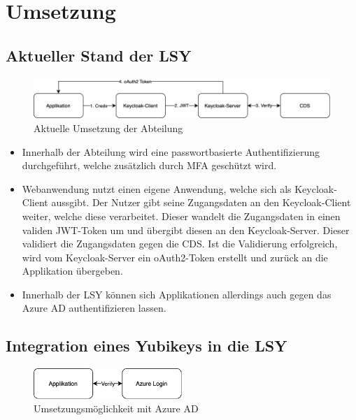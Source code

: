 \chapter{Umsetzung}

\section{Aktueller Stand der LSY}
\begin{figure}[h]
	\centering 
	\includegraphics[width=1\textwidth]{img/abbildungen/Unknown.png}
	\captionsetup{format=hang}
	\caption{Aktuelle Umsetzung der Abteilung}
\end{figure}

\begin{itemize}
    \item Innerhalb der Abteilung wird eine passwortbasierte Authentifizierung durchgeführt, welche zusätzlich durch \ac{MFA} geschützt wird.
    \item Webanwendung nutzt einen eigene Anwendung, welche sich als Keycloak-Client aussgibt. Der Nutzer gibt seine Zugangsdaten an den Keycloak-Client weiter, welche diese verarbeitet. Dieser wandelt die Zugangsdaten in einen validen JWT-Token um und übergibt diesen an den Keycloak-Server. Dieser validiert die Zugangsdaten gegen die \ac{CDS}. Ist die Validierung erfolgreich, wird vom Keycloak-Server ein oAuth2-Token erstellt und zurück an die Applikation übergeben.
    \item Innerhalb der \ac{LSY} können sich Applikationen allerdings auch gegen das Azure \ac{AD} authentifizieren lassen. 
\end{itemize}

\section{Integration eines Yubikeys in die LSY}

\begin{figure}[h]
	\centering 
	\includegraphics[width=0.5\textwidth]{img/abbildungen/azure_umsetzung.png}
	\captionsetup{format=hang}
	\caption{Umsetzungsmöglichkeit mit Azure \ac{AD}}
\end{figure}

